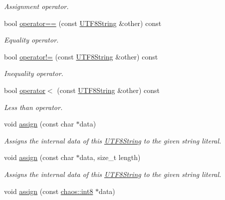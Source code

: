\begin{DoxyCompactItemize}
\begin{DoxyCompactList}\small\item\em Assignment operator. \end{DoxyCompactList}\item 
bool \hyperlink{classchaos_1_1str_1_1_u_t_f8_string_ae4446150398d498e8aa9ebbc05ca7b52}{operator==} (const \hyperlink{classchaos_1_1str_1_1_u_t_f8_string}{U\-T\-F8\-String} \&other) const 
\begin{DoxyCompactList}\small\item\em Equality operator. \end{DoxyCompactList}\item 
bool \hyperlink{classchaos_1_1str_1_1_u_t_f8_string_a166394399a4d200494b40e034aa330da}{operator!=} (const \hyperlink{classchaos_1_1str_1_1_u_t_f8_string}{U\-T\-F8\-String} \&other) const 
\begin{DoxyCompactList}\small\item\em Inequality operator. \end{DoxyCompactList}\item 
bool \hyperlink{classchaos_1_1str_1_1_u_t_f8_string_ac7b54ed9c42a9c9a0a386d453d2c1daa}{operator$<$} (const \hyperlink{classchaos_1_1str_1_1_u_t_f8_string}{U\-T\-F8\-String} \&other) const 
\begin{DoxyCompactList}\small\item\em Less than operator. \end{DoxyCompactList}\item 
void \hyperlink{classchaos_1_1str_1_1_u_t_f8_string_a483e71ec1090e346c63bf2b13b37ad7a}{assign} (const char $\ast$data)
\begin{DoxyCompactList}\small\item\em Assigns the internal data of this \hyperlink{classchaos_1_1str_1_1_u_t_f8_string}{U\-T\-F8\-String} to the given string literal. \end{DoxyCompactList}\item 
void \hyperlink{classchaos_1_1str_1_1_u_t_f8_string_a631f935a5b85214a2fa662a78f5693aa}{assign} (const char $\ast$data, size\-\_\-t length)
\begin{DoxyCompactList}\small\item\em Assigns the internal data of this \hyperlink{classchaos_1_1str_1_1_u_t_f8_string}{U\-T\-F8\-String} to the given string literal. \end{DoxyCompactList}\item 
void \hyperlink{classchaos_1_1str_1_1_u_t_f8_string_a861874ab4bff725c9c10b20a14533221}{assign} (const \hyperlink{namespacechaos_a56015674cfe4ad1fc583c3da6c724d8a}{chaos\-::int8} $\ast$data)

\end{DoxyCompactItemize}
